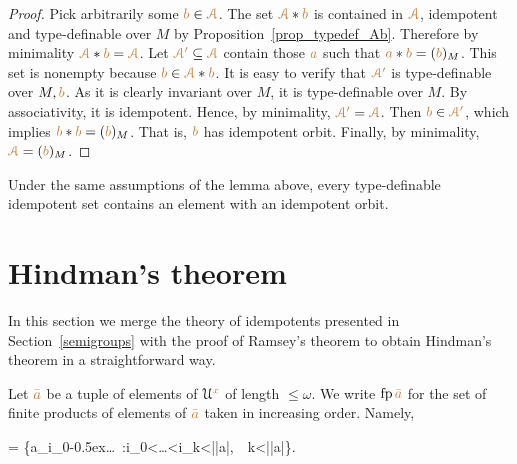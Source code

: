 \begin{proof}
Pick arbitrarily some ${\color{brown} b}\in{\color{brown}\EuScript A}$.
%
The set ${\color{brown}\EuScript A}*{\color{brown} b}$ is contained in ${\color{brown}\EuScript A}$, idempotent and 
type-definable over $M$ by Proposition~\ref{prop_typedef_Ab}.
%
Therefore by minimality ${\color{brown}\EuScript A}*{\color{brown} b}={\color{brown}\EuScript A}$.
%
Let ${\color{brown}\EuScript A'}\subseteq{\color{brown}\EuScript A}$ contain those ${\color{brown} a}$ such that 
${\color{brown} a}*{\color{brown} b}=({\color{brown} b})_M$.
%
This set is nonempty because ${\color{brown} b}\in{\color{brown}\EuScript A}*{\color{brown} b}$.
%
It is easy to verify that ${\color{brown}\EuScript A'}$ is type-definable over $M,{\color{brown} b}$.
%
As it is clearly invariant over $M$, it is type-definable over $M$.
%
By associativity, it is idempotent.
%
Hence, by minimality, ${\color{brown}\EuScript A'}={\color{brown}\EuScript A}$.
%
Then ${\color{brown} b}\in{\color{brown}\EuScript A'}$, which implies ${\color{brown} b}*{\color{brown} b}=({\color{brown} b})_M$.
%
That is, ${\color{brown} b}$ has idempotent orbit.
%
Finally, by minimality, ${\color{brown}\EuScript A}=({\color{brown} b})_M$.
\end{proof}

\begin{corollary}\label{corol_idempotent}
Under the same assumptions of the lemma above, every type-definable 
idempotent set contains an element with an idempotent orbit.
\end{corollary}


\section{Hindman's theorem}\label{Hindman}

In this section we merge the theory of idempotents presented in Section~\ref{semigroups}
with the proof of Ramsey's theorem to obtain Hindman's theorem in a straightforward way.

Let ${\color{brown}\bar a}$ be a tuple of elements of $\EuScript U^{\color{brown} x}$ of length $\le\omega$.
We write ${\rm fp}\,{\color{brown}\bar a}$ for the set of finite products of elements 
of ${\color{brown}\bar a}$ taken in increasing order. 
Namely, 

{=}
{\Big\{{\mr a_{i_0}}\kern-0.5ex\cdot\dots{}\ :\quad i_0<\dots<i_k<|{\mr\bar a}|,\ \ k<|{\mr\bar a}|\Big\}}. 

